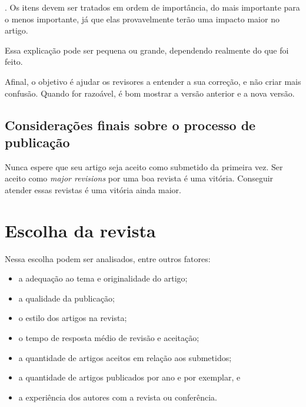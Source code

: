 \documentclass[openany]{book}
\begin{document}
. Os itens devem ser tratados em ordem de importância, do mais importante para o menos importante, já que elas provavelmente terão uma impacto maior no artigo.

 Essa explicação pode ser pequena ou grande, dependendo realmente do que foi feito.

 Afinal, o objetivo é ajudar os revisores a entender a sua correção, e não criar mais confusão.  Quando for razoável, é bom mostrar a versão anterior e a nova versão.



\section{Considerações finais sobre o processo de publicação}

Nunca espere que seu artigo seja aceito como submetido da primeira vez. Ser aceito como \textit{major revisions} por uma boa revista é uma vitória. Conseguir atender essas revistas é uma vitória ainda maior.



\chapter{Escolha da revista}


Nessa escolha podem ser analisados, entre outros fatores:
\begin{itemize}
    \item a adequação ao tema e originalidade do artigo;
    \item a qualidade da publicação;
    \item o estilo dos artigos na revista;
    \item o tempo de resposta médio de revisão e aceitação;
    \item a quantidade de artigos aceitos em relação aos submetidos;
    \item a quantidade de artigos publicados por ano e por exemplar, e
    \item a experiência dos autores com a revista ou conferência.
\end{itemize}
\end{document}
